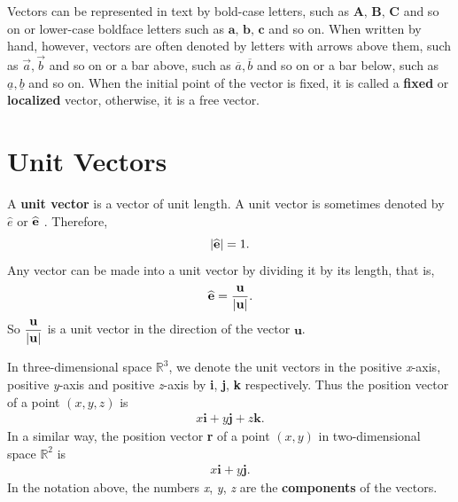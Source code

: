 \documentclass[titlepage,a4paper,12pt]{report}
\begin{document}
\noindent Vectors can be represented in text by bold-case letters, such as $\textbf{A, B, C}$ and so on or lower-case boldface letters such as $\textbf{a, b, c}$ and so on. When written by hand, however, vectors are often denoted by letters with arrows above them, such as $\overrightarrow{a}, \overrightarrow{b}$ and so on or a bar above, such as $\overline{a}, \overline{ b}$ and so on or a bar below, such as $\underline{a}, \underline{b}$ and so on. When the initial point of the vector is fixed, it is called a \textbf{fixed} or \textbf{localized} vector, otherwise, it is a free vector.

\section{Unit Vectors}
A \textbf{unit vector} is a vector of unit length. A unit vector is sometimes denoted by $\widehat{e}$ or $\widehat{\bf{e}}$ . Therefore,
\[|\widehat{\bf{e}}| =1.\] Any vector can be made into a unit vector by dividing it by its length, that is, 
\[\widehat{\bf{e}}=\dfrac{\bf{u}}{|\bf{u}|}.\] So $\dfrac{\bf{u}}{|\bf{u}|}$ is a unit vector in the direction of the vector $\textbf{u}$.

\noindent In three-dimensional space $\mathbb{R}^3$, we denote the unit vectors in the positive \textit{x}-axis, positive \textit{y}-axis and positive \textit{z}-axis by \textbf{i}, \textbf{j}, \textbf{k} respectively. Thus the position vector of a point $(x,y,z)$ is
\begin{eqnarray}
x\textbf{i}+y\textbf{j}+z\textbf{k}.\nonumber
\end{eqnarray}
In a similar way, the position vector \textbf{r} of a point $(x,y)$ in two-dimensional space $\mathbb{R}^2$ is 
\begin{eqnarray}
x\textbf{i}+y\textbf{j}. \nonumber
\end{eqnarray}
In the notation above, the numbers \textit{x}, \textit{y}, \textit{z} are the \textbf{components} of the vectors.
\end{document}
